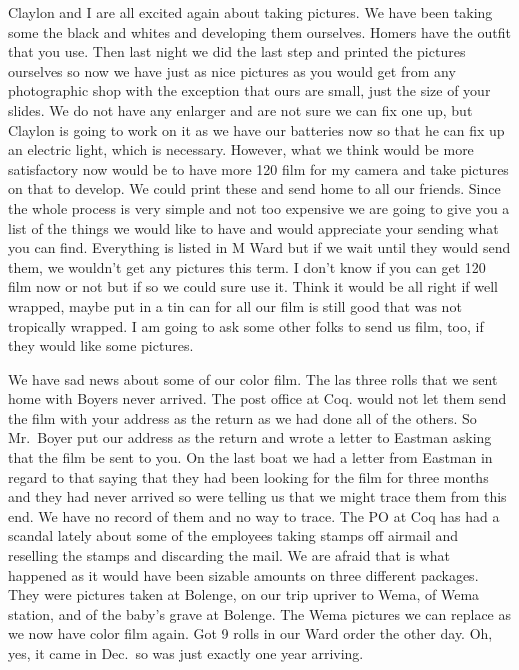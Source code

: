 \documentclass[
]{book}
\begin{document}
Claylon and I are all excited again about taking pictures. We have been taking some the black and whites and developing them ourselves. Homers have the outfit that you use. Then last night we did the last step and printed the pictures ourselves so now we have just as nice pictures as you would get from any photographic shop with the exception that ours are small, just the size of your slides. We do not have any enlarger and are not sure we can fix one up, but Claylon is going to work on it as we have our batteries now so that he can fix up an electric light, which is necessary. However, what we think would be more satisfactory now would be to have more 120 film for my camera and take pictures on that to develop. We could print these and send home to all our friends. Since the whole process is very simple and not too expensive we are going to give you a list of the things we would like to have and would appreciate your sending what you can find. Everything is listed in M Ward but if we wait until they would send them, we wouldn't get any pictures this term. I don't know if you can get 120 film now or not but if so we could sure use it. Think it would be all right if well wrapped, maybe put in a tin can for all our film is still good that was not tropically wrapped. I am going to ask some other folks to send us film, too, if they would like some pictures.

We have sad news about some of our color film. The las three rolls that we sent home with Boyers never arrived. The post office at Coq. would not let them send the film with your address as the return as we had done all of the others. So Mr.~Boyer put our address as the return and wrote a letter to Eastman asking that the film be sent to you. On the last boat we had a letter from Eastman in regard to that saying that they had been looking for the film for three months and they had never arrived so were telling us that we might trace them from this end. We have no record of them and no way to trace. The PO at Coq has had a scandal lately about some of the employees taking stamps off airmail and reselling the stamps and discarding the mail. We are afraid that is what happened as it would have been sizable amounts on three different packages. They were pictures taken at Bolenge, on our trip upriver to Wema, of Wema station, and of the baby's grave at Bolenge. The Wema pictures we can replace as we now have color film again. Got 9 rolls in our Ward order the other day. Oh, yes, it came in Dec.~so was just exactly one year arriving.
\end{document}
